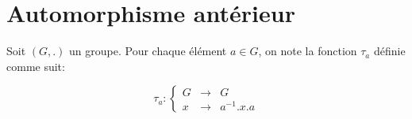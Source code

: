 \documentclass[12pt,a4paper,dvipsnames]{article}
\begin{document}
\section{Automorphisme antérieur}%
\label{sec:automorphisme_antérieur}

Soit $(G,.)$ un groupe. Pour chaque élément  $a\in G$, on note la fonction
$\tau_a$ définie comme suit:

\begin{equation}
    \label{eq:automorphism}
    \tau_a:\left\{\begin{array}{lll}
            G &\longrightarrow & G\\
            x & \longrightarrow & a^{-1}.x.a
        \end{array}
    \right.
\end{equation}
\end{document}
